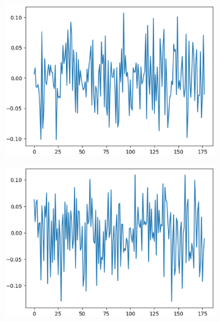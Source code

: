 \documentclass[12pt]{article}
\begin{document}
\begin{figure}
\begin{subfigure}{.5\textwidth}
  \centering
  \includegraphics[width=.8\linewidth]{figures/stack_50_50_dropout_elu_clean_input/weights_neuron_2.eps}
\end{subfigure}%
\begin{subfigure}{.5\textwidth}
  \centering
  \includegraphics[width=.8\linewidth]{figures/stack_50_50_dropout_elu_clean_input/weights_neuron_3.eps}
\end{subfigure}


\end{figure}
\end{document}
